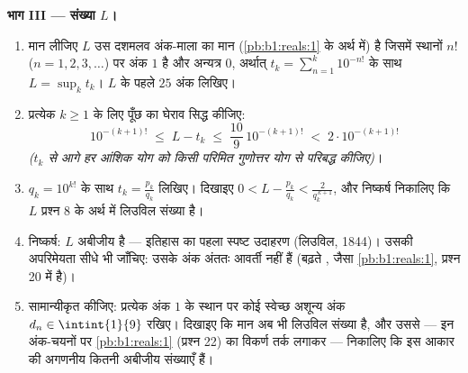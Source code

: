 \begin{problem}
\medskip \noindent\textbf{भाग III --- संख्या $L$।}
\begin{enumerate}[resume]
  \item मान लीजिए $L$ उस दशमलव अंक-माला का मान (\cref{pb:b1:reals:1} के अर्थ
  में) है जिसमें स्थानों $n!$ ($n = 1, 2, 3, \dots$) पर अंक $1$ है और
  अन्यत्र $0$, अर्थात् $t_k = \sum_{n=1}^{k} 10^{-n!}$ के साथ $L = \sup_k
  t_k$। $L$ के पहले $25$ अंक लिखिए।
  \item प्रत्येक $k \geq 1$ के लिए पूँछ का घेराव सिद्ध कीजिए:
        \[
        10^{-(k+1)!} \;\leq\; L - t_k \;\leq\;
        \frac{10}{9}\,10^{-(k+1)!} \;<\; 2\cdot 10^{-(k+1)!}
        \]
        \emph{($t_k$ से आगे हर आंशिक योग को किसी परिमित गुणोत्तर योग से
        परिबद्ध कीजिए)}।
  \item $q_k = 10^{k!}$ के साथ $t_k = \frac{p_k}{q_k}$ लिखिए। दिखाइए $0 < L
  - \frac{p_k}{q_k} < \frac{2}{q_k^{\,k+1}}$, और निष्कर्ष निकालिए कि $L$
  प्रश्न 8 के अर्थ में लिउविल संख्या है।
  \item निष्कर्ष: $L$ अबीजीय है --- इतिहास का पहला स्पष्ट उदाहरण (लिउविल,
  1844)। उसकी अपरिमेयता सीधे भी जाँचिए: उसके अंक अंततः आवर्ती नहीं हैं
  (बढ़ते , जैसा \cref{pb:b1:reals:1}, प्रश्न 20 में है)।
  \item सामान्यीकृत कीजिए: प्रत्येक अंक $1$ के स्थान पर कोई स्वेच्छ अशून्य
  अंक $d_n \in \intint{1}{9}$ रखिए। दिखाइए कि मान अब भी लिउविल संख्या है, और
  उससे --- इन अंक-चयनों पर \cref{pb:b1:reals:1} (प्रश्न 22) का विकर्ण तर्क
  लगाकर --- निकालिए कि इस आकार की अगणनीय कितनी अबीजीय संख्याएँ हैं।
\end{enumerate}


\end{problem}
